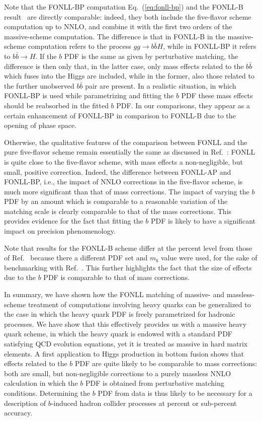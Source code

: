 Note that the
FONLL-BP computation Eq.~(\ref{eq:fonll-bp}) and the FONLL-B
result~\cite{Forte:2016sja} are directly comparable: indeed, they both
include the five-flavor scheme computation up to NNLO, and combine it
with the first
two orders of the massive-scheme computation. The difference is that
in FONLL-B in the massive-scheme computation refers to the process
$gg\to b\bar b H$, while in FONLL-BP it refers to  $b\bar b \to H$. If
the $b$ PDF is the same as given by perturbative matching, the
difference is then only that, in the latter case, only mass effects
related to the $b\bar b$ which fuses into the Higgs are included,
while in the former, also those related to the further unobserved
$b\bar b$ pair are present. In a realistic situation, in which FONLL-BP is used
while parametrizing and fitting the $b$ PDF these mass effects should
be reabsorbed in the fitted $b$ PDF. In our comparisons, they 
appear as a certain enhancement of FONLL-BP in comparison to FONLL-B
due to the opening of phase space. 


Otherwise, the qualitative features of the comparison between FONLL
and the pure five-flavor scheme remain essentially the same as discussed
in Ref.~\cite{Forte:2016sja}: FONLL is quite close to the
five-flavor scheme, with mass effects a non-negligible, but small,
positive correction. Indeed, the difference between
FONLL-AP and FONLL-BP, i.e., the impact of NNLO corrections in the
five-flavor scheme, is much more significant than that of mass corrections.
The impact of varying the $b$ PDF by
an amount which is comparable to a reasonable variation of the
matching scale is clearly comparable to that of the mass
corrections. This provides evidence for the fact that fitting the $b$
PDF is likely to have a significant impact on precision phenomenology.


Note that results for the FONLL-B
scheme differ at the percent level from those of 
Ref.~\cite{Forte:2016sja} because there a different PDF set and $m_b$
value were used,
for the sake of benchmarking with
Ref.~\cite{Bonvini:2015pxa,Bonvini:2016fgf}. This further highlights
the fact that the size of effects due to the $b$ PDF is comparable to
that of mass corrections.

In summary, we have shown how the FONLL matching of massive- and
massless-scheme treatment of computations involving heavy quarks can
be generalized to the case in which the heavy quark PDF is freely
parametrized for hadronic processes. We have show that this
effectively provides us with a massive heavy quark scheme, in which
the heavy quark is endowed with a standard PDF satisfying QCD
evolution equations, yet it is treated as massive in hard matrix
elements. A first application to Higgs production in bottom fusion
shows that effects related to the $b$ PDF are quite likely to be
comparable to mass corrections: both are small, but non-negligible
corrections to a purely massless NNLO calculation in which the $b$ PDF
is obtained from perturbative matching conditions. Determining the $b$
PDF from data is thus likely to be necessary for a description of
$b$-induced hadron collider processes at percent or sub-percent accuracy.

